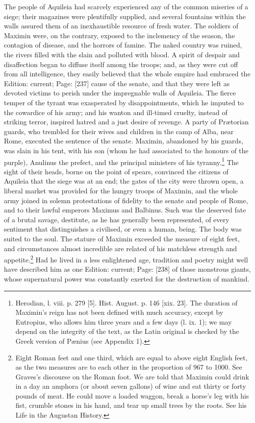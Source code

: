 The people of Aquileia had scarcely experienced any of the common miseries of a siege; their magazines were plentifully supplied, and several fountains within the walls assured them of an inexhaustible resource of fresh water. The soldiers of Maximin were, on the contrary, exposed to the inclemency of the season, the contagion of disease, and the horrors of famine. The naked country was ruined, the rivers filled with the slain and polluted with blood. A spirit of despair and disaffection began to diffuse itself among the troops; and, as they were cut off from all intelligence, they easily believed that the whole empire had embraced the Edition: current; Page: [237] cause of the senate, and that they were left as devoted victims to perish under the impregnable walls of Aquileia. The fierce temper of the tyrant was exasperated by disappointments, which he imputed to the cowardice of his army; and his wanton and ill-timed cruelty, instead of striking terror, inspired hatred and a just desire of revenge. A party of Prætorian guards, who trembled for their wives and children in the camp of Alba, near Rome, executed the sentence of the senate. Maximin, abandoned by his guards, was slain in his tent, with his son (whom he had associated to the honours of the purple), Anulinus the prefect, and the principal ministers of his tyranny.\footnote{Herodian, l. viii. p. 279 [5]. Hist. August. p. 146 [xix. 23]. The duration of Maximin\texthebrew{}’s reign has not been defined with much accuracy, except by Eutropius, who allows him three years and a few days (l. ix. 1); we may depend on the integrity of the text, as the Latin original is checked by the Greek version of Pænius (see Appendix 1).} The sight of their heads, borne on the point of spears, convinced the citizens of Aquileia that the siege was at an end; the gates of the city were thrown open, a liberal market was provided for the hungry troops of Maximin, and the whole army joined in solemn protestations of fidelity to the senate and people of Rome, and to their lawful emperors Maximus and Balbinus. Such was the deserved fate of a brutal savage, destitute, as he has generally been represented, of every sentiment that distinguishes a civilised, or even a human, being. The body was suited to the soul. The stature of Maximin exceeded the measure of eight feet, and circumstances almost incredible are related of his matchless strength and appetite.\footnote{Eight Roman feet and one third, which are equal to above eight English feet, as the two measures are to each other in the proportion of 967 to 1000. See Graves\texthebrew{}’s discourse on the Roman foot. We are told that Maximin could drink in a day an amphora (or about seven gallons) of wine and eat thirty or forty pounds of meat. He could move a loaded waggon, break a horse\texthebrew{}’s leg with his fist, crumble stones in his hand, and tear up small trees by the roots. See his Life in the Augustan History.} Had he lived in a less enlightened age, tradition and poetry might well have described him as one Edition: current; Page: [238] of those monstrous giants, whose supernatural power was constantly exerted for the destruction of mankind.

